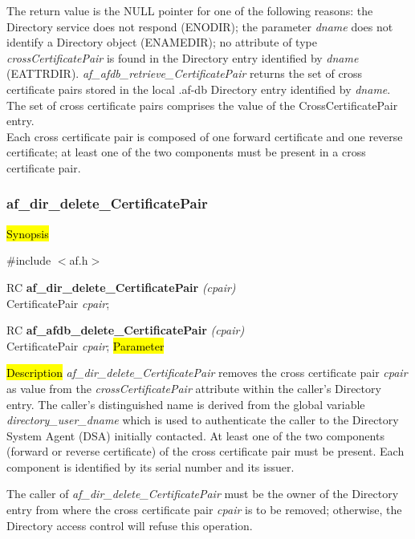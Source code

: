 The return value is the NULL pointer for one of the following reasons:
\bi
\m the Directory service does not respond (ENODIR);
\m the parameter {\em dname} does not identify a Directory object (ENAMEDIR);
\m no attribute of type {\em crossCertificatePair} is found in the Directory entry
identified by {\em dname} (EATTRDIR).
\ei
{\em af\_afdb\_retrieve\_CertificatePair} returns the set of cross certificate pairs 
stored in the local .af-db Directory entry identified by {\em dname}. 
The set of cross certificate pairs 
comprises the value of the CrossCertificatePair entry. \\
Each cross certificate pair is composed of one forward certificate and one reverse certificate;
at least one of the two components must be present in a cross certificate pair.



\subsubsection{af\_dir\_delete\_CertificatePair}

\hl{Synopsis}

\#include $<$af.h$>$

RC {\bf af\_dir\_delete\_CertificatePair} {\em (cpair)} \\
CertificatePair {\em *cpair};

RC {\bf af\_afdb\_delete\_CertificatePair} {\em (cpair)} \\
CertificatePair {\em *cpair};
\hl{Parameter}

\hl{Description}
{\em af\_dir\_delete\_CertificatePair} removes the cross certificate pair {\em cpair} 
as value from the {\em crossCertificatePair} attribute within the caller's Directory 
entry. The caller's distinguished name is derived from
the global variable {\em directory\_user\_dname} which is used to authenticate the caller to the
Directory System Agent (DSA) initially contacted. At least one of the two components 
(forward or reverse certificate) of the cross 
certificate pair must be present. Each component is identified by its serial number
and its issuer.

The caller of {\em af\_dir\_delete\_CertificatePair} must be the owner of the Directory
entry from where the cross certificate pair {\em cpair} is to be removed; otherwise, the 
Directory access control will refuse this operation.

